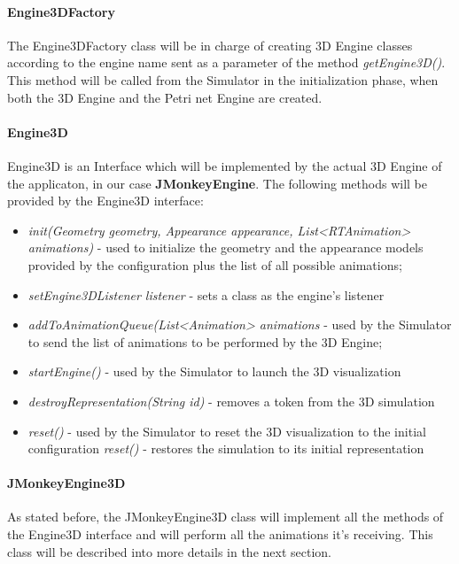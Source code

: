 \paragraph{Engine3DFactory}

The Engine3DFactory class will be in charge of creating 3D Engine classes according to the engine name sent as a parameter of the method \textit{getEngine3D()}. This method will be called from the Simulator in the initialization phase, when both the 3D Engine and the Petri net Engine are created. 

\paragraph{Engine3D}

Engine3D is an Interface which will be implemented by the actual 3D Engine of the applicaton, in our case \textbf{JMonkeyEngine}. The following methods will be provided by the Engine3D interface: 
\begin{itemize}
\item \textit{init(Geometry geometry, Appearance appearance, List<RTAnimation> animations)} - used to initialize the geometry and the appearance models provided by the configuration plus the list of all possible animations;
\item \textit{setEngine3DListener listener} - sets a class as the engine's listener  
\item \textit{addToAnimationQueue(List<Animation> animations} - used by the Simulator to send the list of animations to be performed by the 3D Engine; 
\item \textit{startEngine()} - used by the Simulator to launch the 3D visualization
\item \textit{destroyRepresentation(String id)} - removes a token from the 3D simulation
\item \textit{reset()} - used by the Simulator to reset the 3D visualization to the initial configuration
\textit{reset()} - restores the simulation to its initial representation
\end{itemize}

\paragraph{JMonkeyEngine3D}

As stated before, the JMonkeyEngine3D class will implement all the methods of the Engine3D interface and will perform all the animations it's receiving. This class will be described into more details in the next section.